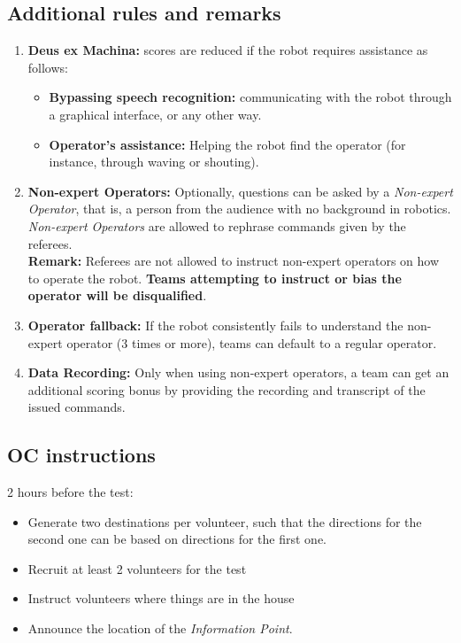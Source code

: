 \subsection*{Additional rules and remarks}
\begin{enumerate}[nosep]
	\item \textbf{Deus ex Machina:} scores are reduced if the robot requires assistance as follows:
	\begin{itemize}[nosep]
		\item \textbf{Bypassing speech recognition:} communicating with the robot through a graphical interface, or any other way.
		
		\item \textbf{Operator's assistance:} Helping the robot find the operator (for instance, through waving or shouting).
	\end{itemize}

	\item \textbf{Non-expert Operators:} Optionally, questions can be asked by a \emph{Non-expert Operator}, that is, a person from the audience with no background in robotics. \emph{Non-expert Operators} are allowed to rephrase commands given by the referees.
	\\\textbf{Remark:} Referees are not allowed to instruct non-expert operators on how to operate the robot. \textbf{Teams attempting to instruct or bias the operator will be disqualified}.

	\item \textbf{Operator fallback:} If the robot consistently fails to understand the non-expert operator (3 times or more), teams can default to a regular operator.
	
	\item \textbf{Data Recording:} Only when using non-expert operators, a team can get an additional scoring bonus by providing the recording and transcript of the issued commands.

\end{enumerate}

\subsection*{OC instructions}
2 hours before the test:
\begin{itemize}
	\item Generate two destinations per volunteer, such that the directions for the second one can be based on directions for the first one.
	\item Recruit at least 2 volunteers for the test
	\item Instruct volunteers where things are in the house
	\item Announce the location of the \emph{Information Point}.
\end{itemize}

